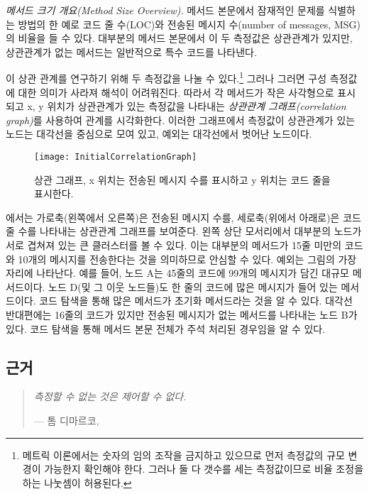\documentclass[a4paper,10pt,twoside]{book}
\begin{document}
\noindent
\emph{메서드 크기 개요(Method Size Overview).}
메서드 본문에서 잠재적인 문제를 식별하는 방법의 한 예로 코드 줄 수(LOC)와 전송된 메시지 수(number of messages, MSG)의 비율을 들 수 있다. 대부분의 메서드 본문에서 이 두 측정값은 상관관계가 있지만, 상관관계가 없는 메서드는 일반적으로 특수 코드를 나타낸다.

이 상관 관계를 연구하기 위해 두 측정값을 나눌 수 있다.\footnote{메트릭 이론에서는 숫자의 임의 조작을 금지하고 있으므로 먼저 측정값의 규모 변경이 가능한지 확인해야 한다\cite{Fent96a}. 그러나 둘 다 갯수를 세는 측정값이므로 비율 조정을 하는 나눗셈이 허용된다.} 그러나 그러면 구성 측정값에 대한 의미가 사라져 해석이 어려워진다. 따라서 각 메서드가 작은 사각형으로 표시되고 x, y 위치가 상관관계가 있는 측정값을 나타내는 \emph{상관관계 그래프(correlation graph)}를 사용하여 관계를 시각화한다. 이러한 그래프에서 측정값이 상관관계가 있는 노드는 대각선을 중심으로 모여 있고, 예외는 대각선에서 벗어난 노드이다.

\begin{figure}
\begin{center}
\texttt{[image: InitialCorrelationGraph]}
\caption{상관 그래프, x 위치는 전송된 메시지 수를 표시하고 y 위치는 코드 줄을 표시한다.}
\end{center}
\end{figure}

에서는 가로축(왼쪽에서 오른쪽)은 전송된 메시지 수를, 세로축(위에서 아래로)은 코드 줄 수를 나타내는 상관관계 그래프를 보여준다. 왼쪽 상단 모서리에서 대부분의 노드가 서로 겹쳐져 있는 큰 클러스터를 볼 수 있다. 이는 대부분의 메서드가 15줄 미만의 코드와 10개의 메시지를 전송한다는 것을 의미하므로 안심할 수 있다. 예외는 그림의 가장자리에 나타난다. 예를 들어, 노드 A는 45줄의 코드에 99개의 메시지가 담긴 대규모 메서드이다. 노드 D(및 그 이웃 노드들)도 한 줄의 코드에 많은 메시지가 들어 있는 메서드이다. 코드 탐색을 통해 많은 메서드가 초기화 메서드라는 것을 알 수 있다. 대각선 반대편에는 16줄의 코드가 있지만 전송된 메시지가 없는 메서드를 나타내는 노드 B가 있다. 코드 탐색을 통해 메서드 본문 전체가 주석 처리된 경우임을 알 수 있다.

\subsection*{근거}

\begin{quotation}
\noindent
\emph{측정할 수 없는 것은 제어할 수 없다.}

\hfill --- 톰 디마르코, \cite{Dema82a}	 
\end{quotation}
\end{document}
